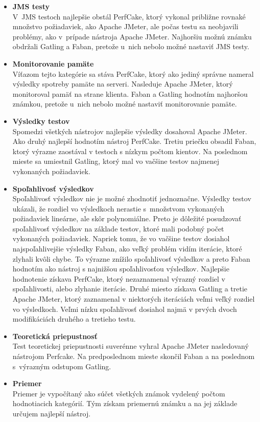 \documentclass[12pt,oneside,final]{fithesis-utf8}
\begin{document}
\begin{itemize}
\item \textbf{JMS testy}\\
V~JMS testoch najlepšie obstál PerfCake, ktorý vykonal približne rovnaké množstvo požiadaviek, ako Apache JMeter, ale počas testu sa neobjavili problémy, ako v~prípade nástroja Apache JMeter. Najhoršiu možnú známku obdržali Gatling a Faban, pretože u~nich nebolo možné nastaviť JMS testy.

\item \textbf{Monitorovanie pamäte}\\
Víťazom tejto kategórie sa stáva PerfCake, ktorý ako jediný správne nameral výsledky spotreby pamäte na serveri. Nasleduje Apache JMeter, ktorý monitoroval pamäť na strane klienta. Faban a Gatling hodnotím najhoršou známkou, pretože u~nich nebolo možné nastaviť monitorovanie pamäte.

\item \textbf{Výsledky testov}\\
Spomedzi všetkých nástrojov najlepšie výsledky dosahoval Apache JMeter. Ako druhý najlepší hodnotím nástroj PerfCake. Tretiu priečku obsadil Faban, ktorý výrazne zaostával v testoch s nízkym počtom kientov. Na poslednom mieste sa umiestnil Gatling, ktorý mal vo vačšine testov najmenej vykonaných požiadaviek.

\item \textbf{Spoľahlivosť výsledkov}\\
Spoľahlivosť výsledkov nie je možné zhodnotiť jednoznačne. Výsledky testov ukázali, že rozdiel vo výsledkoch nerastie s~množstvom vykonaných požiadaviek lineárne, ale skôr polynomiálne. Preto je dôležité posudzovať spoľahlivosť výsledkov na základe testov, ktoré mali podobný počet vykonaných požiadaviek. Napriek tomu, že vo vačšine testov dosiahol najspoľahlivejšie výsledky Faban, ako veľký problém vidím iterácie, ktoré zlyhali kvôli chybe. To výrazne znížilo spoľahlivosť výsledkov a preto Faban hodnotím ako nástroj s najnižšou spoľahlivosťou výsledkov. Najlepšie hodnotenie získava PerfCake, ktorý nezaznamenal výrazný rozdiel v spoľahlivosti, alebo zlyhanie iterácie. Druhé miesto získava Gatling a tretie Apache JMeter, ktorý zaznamenal v niektorých iteráciách veľmi veľký rozdiel vo výsledkoch. Veľmi nízku spoľahlivosť dosiahol najmä v prvých dvoch modifikáciách druhého a tretieho testu.

\item \textbf{Teoretická priepustnosť}\\
Test teoretickej priepustnosti suverénne vyhral Apache JMeter nasledovaný nástrojom Perfcake. Na predposlednom mieste skončil Faban a na poslednom s~výrazným odstupom Gatling.

\item \textbf{Priemer}\\
Priemer je vypočítaný ako súčet všetkých známok vydelený počtom hodnotiacich kategórií. Tým získam priemernú známku a na jej základe určujem najlepší nástroj.

\end{itemize}
\end{document}

